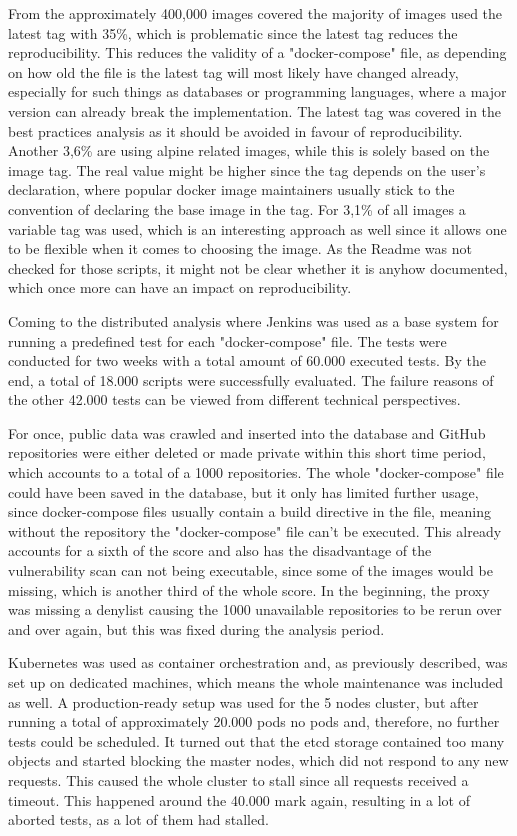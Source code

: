 From the approximately 400,000 images covered the majority of images used the latest tag with 35\%, which is problematic since the latest tag reduces the reproducibility. This reduces the validity of a "docker-compose" file, as depending on how old the file is the latest tag will most likely have changed already, especially for such things as databases or programming languages, where a major version can already break the implementation. The latest tag was covered in the best practices analysis as it should be avoided in favour of reproducibility.
Another 3,6\% are using alpine related images, while this is solely based on the image tag. The real value might be higher since the tag depends on the user's declaration, where popular docker image maintainers usually stick to the convention of declaring the base image in the tag.
For 3,1\% of all images a variable tag was used, which is an interesting approach as well since it allows one to be flexible when it comes to choosing the image. As the Readme was not checked for those scripts, it might not be clear whether it is anyhow documented, which once more can have an impact on reproducibility.

Coming to the distributed analysis where Jenkins was used as a base system for running a predefined test for each "docker-compose" file. The tests were conducted for two weeks with a total amount of 60.000 executed tests. By the end, a total of 18.000 scripts were successfully evaluated. The failure reasons of the other 42.000 tests can be viewed from different technical perspectives.

For once, public data was crawled and inserted into the database and GitHub repositories were either deleted or made private within this short time period, which accounts to a total of a 1000 repositories. The whole "docker-compose" file could have been saved in the database, but it only has limited further usage, since docker-compose files usually contain a build directive in the file, meaning without the repository the "docker-compose" file can't be executed. This already accounts for a sixth of the score and also has the disadvantage of the vulnerability scan can not being executable, since some of the images would be missing, which is another third of the whole score. In the beginning, the proxy was missing a denylist causing the 1000 unavailable repositories to be rerun over and over again, but this was fixed during the analysis period.

Kubernetes was used as container orchestration and, as previously described, was set up on dedicated machines, which means the whole maintenance was included as well. A production-ready setup was used for the 5 nodes cluster, but after running a total of approximately 20.000 pods no pods and, therefore, no further tests could be scheduled. It turned out that the etcd storage contained too many objects and started blocking the master nodes, which did not respond to any new requests. This caused the whole cluster to stall since all requests received a timeout. This happened around the 40.000 mark again, resulting in a lot of aborted tests, as a lot of them had stalled.

